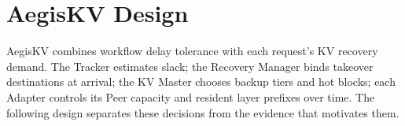 \section{AegisKV Design}
\label{sec:design}

AegisKV combines workflow delay tolerance with each request's KV
recovery demand. The Tracker estimates slack; the Recovery Manager binds
takeover destinations at arrival; the KV Master chooses backup tiers
and hot blocks; each Adapter controls its Peer capacity and resident
layer prefixes over time. The following design
separates these decisions from the evidence that motivates them.








